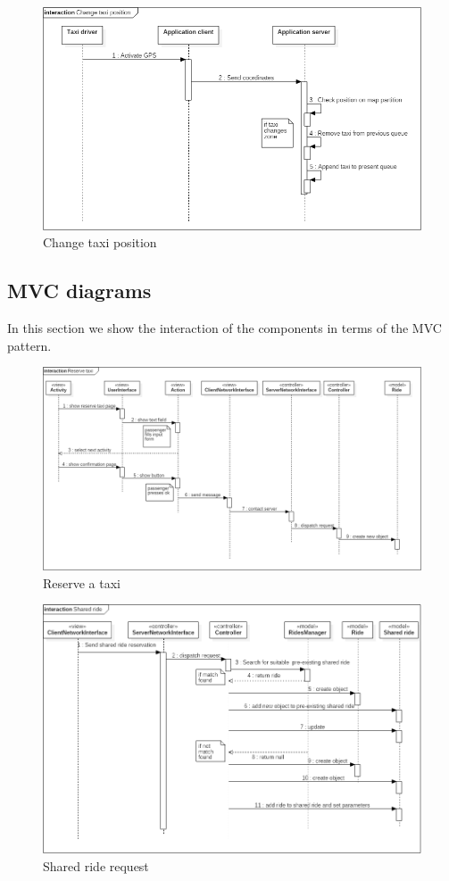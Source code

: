 \newpage
\begin{figure} [h]
\centering
\includegraphics[scale=0.5]{Sequence Diagrams/change_taxi_position.png}
\caption{Change taxi position }
\end{figure}
\newpage
	\subsection{MVC diagrams}
In this section we show the interaction of the components in terms of the MVC pattern. 
\begin{figure} [h]
\centering
\includegraphics[scale=0.4]{Sequence Diagrams/MVC_reserve_taxi.png}
\caption{Reserve a taxi }
\end{figure}
\newpage
\begin{figure} [h]
\centering
\includegraphics[scale=0.5]{Sequence Diagrams/MVC_Shared_ride.png}
\caption{Shared ride request }
\end{figure}
\newpage
\newpage
